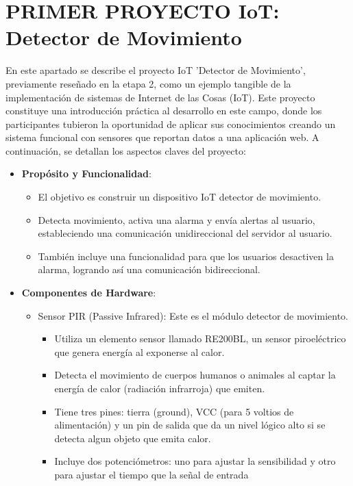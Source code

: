 \documentclass{report}
\begin{document}
\chapter{PRIMER PROYECTO IoT: Detector de Movimiento}
En este apartado se describe el proyecto IoT 'Detector de Movimiento', previamente reseñado en la etapa 2, como un ejemplo tangible 
de la implementación de sistemas de Internet de las Cosas (IoT). Este proyecto constituye una introducción práctica al desarrollo 
en este campo, donde los participantes tubieron la oportunidad de aplicar sus conocimientos creando un sistema funcional con sensores 
que reportan datos a una aplicación web.
A continuación, se detallan los aspectos claves del proyecto:
\begin{itemize}
    \item \textbf{Propósito y Funcionalidad}:
    \begin{itemize}
        \item El objetivo es construir un dispositivo IoT detector de movimiento.
        \item Detecta movimiento, activa una alarma y envía alertas al usuario, estableciendo una comunicación unidireccional del 
        servidor al usuario.
        \item También incluye una funcionalidad para que los usuarios desactiven la alarma, logrando así una comunicación bidireccional. 
    \end{itemize}
    \item \textbf{Componentes de Hardware}:
    \begin{itemize}
        \item Sensor PIR (Passive Infrared): Este es el módulo detector de movimiento.
            \begin{itemize}
                \item Utiliza un elemento sensor llamado RE200BL, un sensor piroeléctrico que genera energía al exponerse al calor.
                \item Detecta el movimiento de cuerpos humanos o animales al captar la energía de calor (radiación infrarroja) que emiten.
                \item Tiene tres pines: tierra (ground), VCC (para 5 voltios de alimentación) y un pin de salida que da un nivel lógico alto 
                si se detecta algun objeto que emita calor.
                \item Incluye dos potenciómetros: uno para ajustar la sensibilidad y otro para ajustar el tiempo que la señal de entrada 

\end{itemize}
\end{itemize}
\end{itemize}
\end{document}
